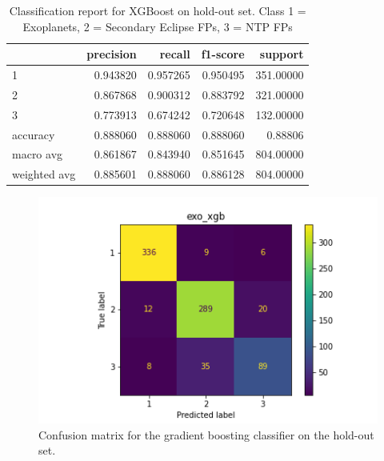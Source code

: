 \documentclass{article}
\begin{document}
\begin{table}[H]
	\begin{center}
\begin{tabular}{l|r|r|r|r}
	
	{} &  precision &    recall &  f1-score &    support \\ \hline
	
	1            &   0.943820 &  0.957265 &  0.950495 &  351.00000 \\ \hline
	2            &   0.867868 &  0.900312 &  0.883792 &  321.00000 \\ \hline
	3            &   0.773913 &  0.674242 &  0.720648 &  132.00000 \\ \hline
	accuracy     &   0.888060 &  0.888060 &  0.888060 &    0.88806 \\ \hline
	macro avg    &   0.861867 &  0.843940 &  0.851645 &  804.00000 \\ \hline
	weighted avg &   0.885601 &  0.888060 &  0.886128 &  804.00000 \\ \hline
	
\end{tabular}
	\end{center}
	\caption{Classification report for XGBoost on hold-out set. Class 1 = Exoplanets, 2 = Secondary Eclipse FPs, 3 = NTP FPs}
\end{table}
\begin{figure}[H]
	\begin{center}
		\includegraphics[totalheight=6cm]{figures/exo_xgb_cfmat.png}
	\end{center}
	\caption{Confusion matrix for the gradient boosting classifier on the hold-out set.}
\end{figure}
\end{document}
